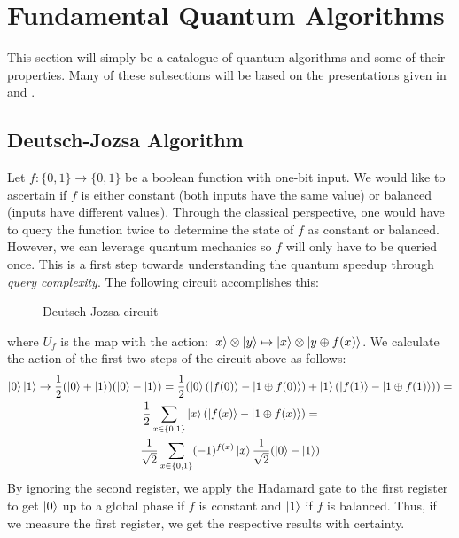 

\section{Fundamental Quantum Algorithms}

This section will simply be a catalogue of quantum algorithms and some of their properties. Many of these subsections will be based on the presentations given in \cite{childs17} and \cite{batty2004quantum}.

\subsection{Deutsch-Jozsa Algorithm}
Let $f: \{0,1\} \rightarrow \{0,1\}$ be a boolean function with one-bit input. We would like to ascertain if $f$ is either constant (both inputs have the same value) or balanced (inputs have different values). Through the classical perspective, one would have to query the function twice to determine the state of $f$ as constant or balanced. However, we can leverage quantum mechanics so $f$ will only have to be queried once. This is a first step towards understanding the quantum speedup through \emph{query complexity}.
%
The following circuit accomplishes this:

\begin{figure}[ht]
    \centering
    \leavevmode
    \caption{Deutsch-Jozsa circuit}
\end{figure}
%
where $U_f$ is the map with the action: $\ket{x}\otimes\ket{y} \mapsto \ket{x}\otimes\ket{y \oplus f(x)}$. We calculate the action of the first two steps of the circuit above as follows:
%
\begin{gather}
  \ket{0}\ket{1} \rightarrow \frac{1}{2}(\ket{0} + \ket{1})(\ket{0} - \ket{1}) = \frac{1}{2}(\ket{0}(\ket{f(0)} - \ket{1 \oplus f(0)}) + \ket{1}(\ket{f(1)} - \ket{1 \oplus f(1)})) = \\
  \frac{1}{2}\sum_{x \in \{0,1\}} \ket{x}(\ket{f(x)} - \ket{1 \oplus f(x)}) = \\
  \frac{1}{\sqrt{2}} \sum_{x \in \{0,1\}} (-1)^{f(x)}\ket{x} \frac{1}{\sqrt{2}}(\ket{0} -
  \ket{1})
\end{gather}
By ignoring the second register, we apply the Hadamard gate to the first register to get $\ket{0}$ up to a global phase if $f$ is constant and $\ket{1}$ if $f$ is balanced. Thus, if we measure the first register, we get the respective results with certainty.

